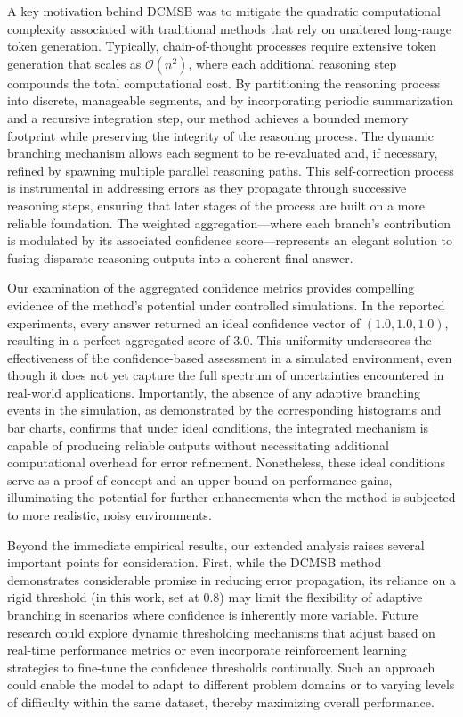\documentclass{article}
\begin{document}
A key motivation behind DCMSB was to mitigate the quadratic computational complexity associated with traditional methods that rely on unaltered long-range token generation. Typically, chain-of-thought processes require extensive token generation that scales as $\mathcal{O}(n^2)$, where each additional reasoning step compounds the total computational cost. By partitioning the reasoning process into discrete, manageable segments, and by incorporating periodic summarization and a recursive integration step, our method achieves a bounded memory footprint while preserving the integrity of the reasoning process. The dynamic branching mechanism allows each segment to be re-evaluated and, if necessary, refined by spawning multiple parallel reasoning paths. This self-correction process is instrumental in addressing errors as they propagate through successive reasoning steps, ensuring that later stages of the process are built on a more reliable foundation. The weighted aggregation—where each branch’s contribution is modulated by its associated confidence score—represents an elegant solution to fusing disparate reasoning outputs into a coherent final answer.

Our examination of the aggregated confidence metrics provides compelling evidence of the method’s potential under controlled simulations. In the reported experiments, every answer returned an ideal confidence vector of $(1.0, 1.0, 1.0)$, resulting in a perfect aggregated score of 3.0. This uniformity underscores the effectiveness of the confidence-based assessment in a simulated environment, even though it does not yet capture the full spectrum of uncertainties encountered in real-world applications. Importantly, the absence of any adaptive branching events in the simulation, as demonstrated by the corresponding histograms and bar charts, confirms that under ideal conditions, the integrated mechanism is capable of producing reliable outputs without necessitating additional computational overhead for error refinement. Nonetheless, these ideal conditions serve as a proof of concept and an upper bound on performance gains, illuminating the potential for further enhancements when the method is subjected to more realistic, noisy environments.

Beyond the immediate empirical results, our extended analysis raises several important points for consideration. First, while the DCMSB method demonstrates considerable promise in reducing error propagation, its reliance on a rigid threshold (in this work, set at 0.8) may limit the flexibility of adaptive branching in scenarios where confidence is inherently more variable. Future research could explore dynamic thresholding mechanisms that adjust based on real-time performance metrics or even incorporate reinforcement learning strategies to fine-tune the confidence thresholds continually. Such an approach could enable the model to adapt to different problem domains or to varying levels of difficulty within the same dataset, thereby maximizing overall performance.
\end{document}
